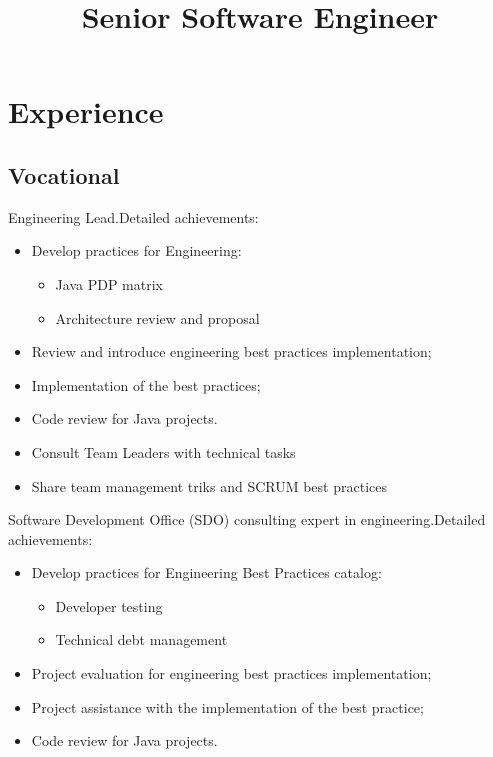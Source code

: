 \documentclass[11pt, a4paper]{moderncv}
\title{Senior Software Engineer}
\begin{document}
\makecvtitle

\section{Experience}
\subsection{Vocational}
{Engineering Lead.\newline{}Detailed achievements:
\begin{itemize}
\item Develop practices for Engineering:
\begin{itemize}
\item Java PDP matrix
\item Architecture review and proposal
\end{itemize}
\item Review and introduce engineering best practices implementation;
\item Implementation of the best practices;
\item Code review for Java projects.
\item Consult Team Leaders with technical tasks
\item Share team management triks and SCRUM best practices 
\end{itemize}}

{Software Development Office (SDO) consulting expert in engineering.\newline{}Detailed achievements:
\begin{itemize}
\item Develop practices for Engineering Best Practices catalog:
\begin{itemize}
\item Developer testing
\item Technical debt management
\end{itemize}
\item Project evaluation for engineering best practices implementation;
\item Project assistance with the implementation of the best practice;
\item Code review for Java projects.
\end{itemize}}
\end{document}
